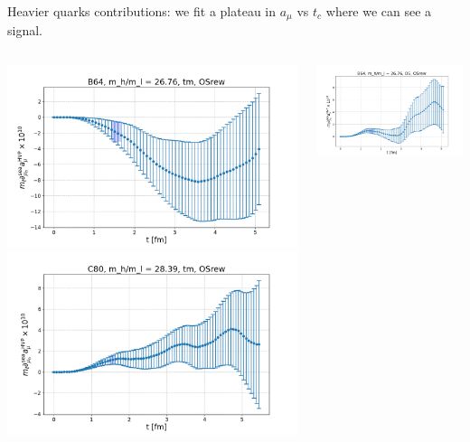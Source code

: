 \documentclass[xcolor={dvipsnames,table}]{beamer}
\begin{document}
\begin{frame}
  Heavier quarks contributions: we fit a plateau in $a_\mu$ vs $t_c$ where we can see a signal.
  \begin{columns}
    \begin{column}{0.5\textwidth}
      \includegraphics[trim=0cm 0.3cm 0cm 1.2cm, clip,width=\textwidth]{plots/der_mq_sea_lore/amu_B64_tm_der_026ml.png}
      \includegraphics[trim=0cm 0.3cm 0cm 1.2cm, clip,width=\textwidth]{plots/der_mq_sea_lore/amu_C80_tm_der_028ml.png}
    \end{column}
    \begin{column}{0.5\textwidth}
      \includegraphics[trim=0cm 0.3cm 0cm 1.2cm, clip,width=\textwidth]{plots/der_mq_sea_lore/amu_B64_OS_der_026ml.png}

\end{column}
\end{columns}
\end{frame}
\end{document}
